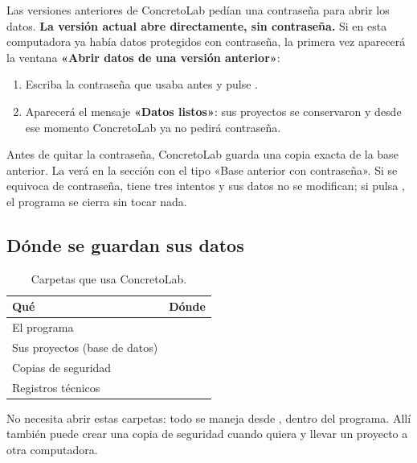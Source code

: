 
Las versiones anteriores de ConcretoLab pedían una contraseña para abrir los datos. \textbf{La versión actual abre
directamente, sin contraseña.} Si en esta computadora ya había datos protegidos con contraseña, la primera vez aparecerá
la ventana \textbf{«Abrir datos de una versión anterior»}:

\begin{enumerate}
	\item Escriba la contraseña que usaba antes y pulse .
	\item Aparecerá el mensaje \textbf{«Datos listos»}: sus proyectos se conservaron y desde ese momento ConcretoLab ya
	      no pedirá contraseña.
\end{enumerate}

\begin{nota}
Antes de quitar la contraseña, ConcretoLab guarda una copia exacta de la base anterior. La verá en la sección
 con el tipo «Base anterior con contraseña». Si se equivoca de contraseña, tiene tres intentos y
sus datos no se modifican; si pulsa , el programa se cierra sin tocar nada.
\end{nota}

\subsection{Dónde se guardan sus datos}

\begin{table}[H]
	\centering
	\caption{Carpetas que usa ConcretoLab.}
	\label{tab:carpetas}
	\begin{tabular}{L{4.6cm}L{9.2cm}}
		\hline
		\textbf{Qué} & \textbf{Dónde} \\ \hline
		El programa &  \\
		Sus proyectos (base de datos) &  \\
		Copias de seguridad &  \\
		Registros técnicos &  \\ \hline
	\end{tabular}
\end{table}

No necesita abrir estas carpetas: todo se maneja desde , dentro del programa. Allí también puede
crear una copia de seguridad cuando quiera y llevar un proyecto a otra computadora.
